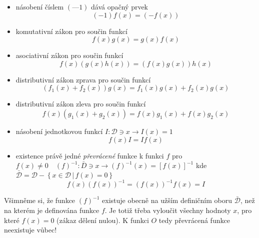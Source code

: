 \begin{itemize}
\begin{equation}
          \end{equation}
        \item násobení číslem \((—1)\) dává opačný prvek
          \begin{equation}\label{mai:eq020}
            (-1)f(x)=(-f(x))
          \end{equation}
        \item komutativní zákon pro součin funkcí
          \begin{equation}\label{mai:eq021}
            f(x)g(x)=g(x)f(x)
          \end{equation}
        \item asociativní zákon pro součin funkcí 
          \begin{equation}\label{mai:eq022}
            f(x)(g(x)h(x))=(f(x)g(x))h(x)
          \end{equation}
        \item distributivní zákon zprava pro součin funkcí
          \begin{equation}\label{mai:eq023}
            (f_1(x) + f_2(x))g(x) =f_1(x)g(x) + f_2(x)g(x)
          \end{equation}
        \item distributivní zákon zleva pro součin funkcí
          \begin{equation}\label{mai:eq024}
            f(x)(g_1(x) + g_2(x))=f(x)g_1(x)+f(x)g_2(x)
          \end{equation}
        \item násobení jednotkovou funkcí \(I: \mathcal{D}\ni x \rightarrow I(x) = 1\)  
          \begin{equation}\label{mai:eq025}
           f(x)I=If(x)
          \end{equation}
        \item existence právě jedné \emph{převrácené} funkce k funkci \(f\) pro \(f(x)\neq0\quad 
              (f)^{-1}: \bar{D}\ni x\rightarrow (f)^{-1}(x)=[f(x)]^{-1}\) kde \(\bar{\mathcal{D}} 
              = \mathcal{D} - \left\{x\in \mathcal{D}\,|\,f(x)=0\right\}\)
          \begin{equation}
            f(x)(f(x))^{-1}=(f(x))^{-1}f(x) = I
          \end{equation}
      \end{itemize}
      Všimněme si, že funkce \((f)^{-1}\) existuje obecně na užším definičním oboru 
      \(\bar{\mathcal{D}}\), než na kterém je definována funkce \(f\). Je totiž třeba vyloučit 
      všechny hodnoty \(x\), pro které \(f(x) = 0\) (zákaz dělení nulou). K funkci \(O\) tedy 
      převrácená funkce neexistuje vůbec!
      
